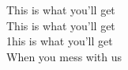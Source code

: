 This is what you'll get \\
This is what you'll get \\
1his is what you'll get \\
When you mess with us \\


